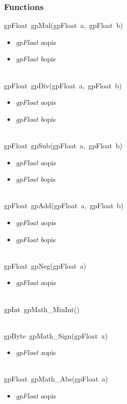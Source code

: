 \subsubsection{Functions}
\mbox{\textsf{gpFloat gpMul(gpFloat a, gpFloat b)}}
	\begin{itemize}
		\item \textit{gpFloat a}\quad opis
		\item \textit{gpFloat b}\quad opis
	\end{itemize}

 \ \\
\mbox{\textsf{gpFloat gpDiv(gpFloat a, gpFloat b)}}
	\begin{itemize}
		\item \textit{gpFloat a}\quad opis
		\item \textit{gpFloat b}\quad opis
	\end{itemize}

 \ \\
\mbox{\textsf{gpFloat gpSub(gpFloat a, gpFloat b)}}
	\begin{itemize}
		\item \textit{gpFloat a}\quad opis
		\item \textit{gpFloat b}\quad opis
	\end{itemize}

 \ \\
\mbox{\textsf{gpFloat gpAdd(gpFloat a, gpFloat b)}}
	\begin{itemize}
		\item \textit{gpFloat a}\quad opis
		\item \textit{gpFloat b}\quad opis
	\end{itemize}

 \ \\
\mbox{\textsf{gpFloat gpNeg(gpFloat a)}}
	\begin{itemize}
		\item \textit{gpFloat a}\quad opis
	\end{itemize}

 \ \\
\mbox{\textsf{gpInt gpMath_MinInt()}}

 \ \\
\mbox{\textsf{gpByte gpMath_Sign(gpFloat x)}}
	\begin{itemize}
		\item \textit{gpFloat x}\quad opis
	\end{itemize}

 \ \\
\mbox{\textsf{gpFloat gpMath_Abs(gpFloat a)}}
	\begin{itemize}
		\item \textit{gpFloat a}\quad opis
	\end{itemize}

